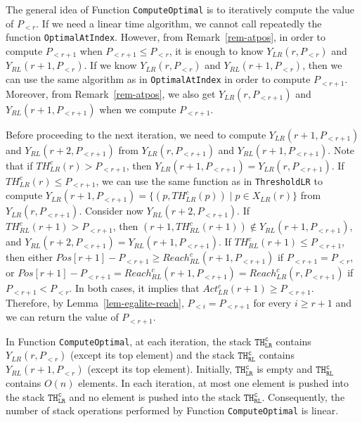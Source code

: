 \documentclass{article}
\newcommand\rclr{Reach_{LR}^c\xspace}
\newcommand\rcrl{Reach_{RL}^c\xspace}
\newcommand\aclr{Act_{LR}^c\xspace}
\newcommand\tclr{TH_{LR}^c\xspace}
\newcommand\tcrl{TH_{RL}^c\xspace}
\newcommand\CompThLR{\mbox{{\tt ThresholdLR}}\xspace}
\newcommand\CompOptimal{\mbox{{\tt ComputeOptimal}}\xspace}
\newcommand\CompOptimalPos{{{\tt Optimal\-At\-Index}}\xspace}
\begin{document}
The general idea of Function \CompOptimal is to iteratively compute
the value of $P_{<r}$. If we need a linear time algorithm, we cannot
call repeatedly the function \CompOptimalPos. However, from
Remark~\ref{rem-atpos}, in order to compute $P_{<r+1}$ when $P_{<r+1}
\leq P_{<r}$, it is enough to know $Y_{LR}(r,P_{<r})$ and
$Y_{RL}(r+1,P_{<r})$.  If we know $Y_{LR}(r,P_{<r})$ and
$Y_{RL}(r+1,P_{<r})$, then we can use the same algorithm as in
\CompOptimalPos in order to compute $P_{<r+1}$. Moreover, from
Remark~\ref{rem-atpos}, we also get $Y_{LR}(r,P_{<r+1})$ and
$Y_{RL}(r+1,P_{<r+1})$ when we compute $P_{<r+1}$.

Before proceeding to the next iteration, we need to compute
$Y_{LR}(r+1,P_{<r+1})$ and $Y_{RL}(r+2,P_{<r+1})$ from
$Y_{LR}(r,P_{<r+1})$ and $Y_{RL}(r+1,P_{<r+1})$. Note that if
$\tclr(r) > P_{<r+1}$, then $Y_{LR}(r+1,P_{<r+1}) =
Y_{LR}(r,P_{<r+1})$. If $\tclr(r) \leq P_{<r+1}$, we can use the
same function as in \CompThLR to compute $Y_{LR}(r+1,P_{<r+1}) =
\{(p,\tclr(p)) \mid p \in X_{LR}(r)\}$ from $Y_{LR}(r,P_{<r+1})$.
Consider now $Y_{RL}(r+2,P_{<r+1})$. If $\tcrl(r+1) > P_{<r+1}$,
then $(r+1,\tcrl(r+1)) \notin Y_{RL}(r+1,P_{<r+1})$, and
$Y_{RL}(r+2,P_{<r+1}) = Y_{RL}(r+1,P_{<r+1})$. If $\tcrl(r+1) \leq
P_{<r+1}$, then either $Pos[r+1]-P_{<r+1} \geq
\rcrl(r+1,P_{<r+1})$ if $P_{<r+1} = P_{<r}$, or 
$Pos[r+1]-P_{<r+1} = \rcrl(r+1,P_{<r+1}) =
\rclr(r,P_{<r+1})$ if $P_{<r+1} < P_{<r}$. In both cases, it
implies that $\aclr(r+1) \geq P_{<r+1}$.  Therefore,
by Lemma~\ref{lem-egalite-reach}, $P_{<i} = P_{<r+1}$ for every $i \geq
r+1$ and we can return the value of $P_{<r+1}$.

In Function \CompOptimal, at each iteration, the stack
$\mathtt{\tclr}$ contains $Y_{LR}(r,P_{<r})$ (except its top
element) and the stack $\mathtt{\tcrl}$ contains
$Y_{RL}(r+1,P_{<r})$ (except its top element). Initially,
$\mathtt{\tclr}$ is empty and $\mathtt{\tcrl}$ contains $O(n)$
elements. In each iteration, at most one element is pushed into the
stack $\mathtt{\tclr}$ and no element is pushed into the stack
$\mathtt{\tcrl}$. Consequently, the number of stack operations
performed by Function \CompOptimal is linear. 
\end{document}
